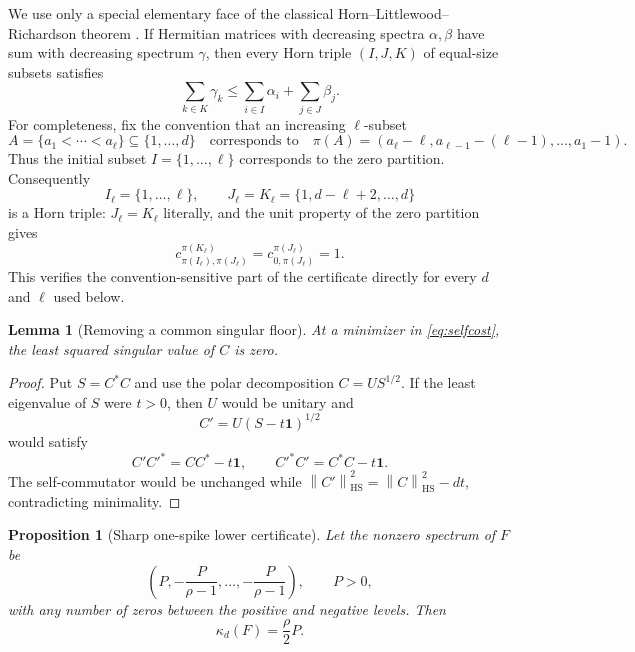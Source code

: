 \documentclass[11pt]{article}
\newtheorem{proposition}[theorem]{Proposition}
\newtheorem{lemma}[theorem]{Lemma}
\theoremstyle{definition}
\theoremstyle{remark}
\newcommand{\1}{\mathbf 1}
\newcommand{\norm}[1]{\left\lVert #1\right\rVert}
\newcommand{\HS}{\mathrm{HS}}
\begin{document}
We use only a special elementary face of the classical Horn--Littlewood--Richardson theorem \cite{horn1962,klyachko1998,knutson1999,fulton2000}.  If Hermitian matrices with decreasing spectra $\alpha,\beta$ have sum with decreasing spectrum $\gamma$, then every Horn triple $(I,J,K)$ of equal-size subsets satisfies
\begin{equation}
 \sum_{k\in K}\gamma_k\le
 \sum_{i\in I}\alpha_i+\sum_{j\in J}\beta_j.
 \label{eq:Horn}
\end{equation}
For completeness, fix the convention that an increasing $\ell$-subset
\[
 A=\{a_1<\cdots<a_\ell\}\subseteq\{1,\ldots,d\}
 \quad\text{corresponds to}\quad
 \pi(A)=(a_\ell-\ell,a_{\ell-1}-(\ell-1),\ldots,a_1-1).
\]
Thus the initial subset $I=\{1,\ldots,\ell\}$ corresponds to the zero partition.  Consequently
\begin{equation}
 I_\ell=\{1,\ldots,\ell\},\qquad
 J_\ell=K_\ell=\{1,d-\ell+2,\ldots,d\}
 \label{eq:triples}
\end{equation}
is a Horn triple: $J_\ell=K_\ell$ literally, and the unit property of the zero partition gives
\[
 c^{\pi(K_\ell)}_{\pi(I_\ell),\pi(J_\ell)}
 =c^{\pi(J_\ell)}_{0,\pi(J_\ell)}=1.
\]
This verifies the convention-sensitive part of the certificate directly for every $d$ and $\ell$ used below.

\begin{lemma}[Removing a common singular floor]
\label{lem:floor}
At a minimizer in \eqref{eq:selfcost}, the least squared singular value of $C$ is zero.
\end{lemma}

\begin{proof}
Put $S=C^*C$ and use the polar decomposition $C=U S^{1/2}$.  If the least eigenvalue of $S$ were $t>0$, then $U$ would be unitary and
\[
 C'=U(S-t\1)^{1/2}
\]
would satisfy
\[
 C'C'^*=CC^*-t\1,\qquad C'^*C'=C^*C-t\1.
\]
The self-commutator would be unchanged while $\norm{C'}_{\HS}^2=\norm C_{\HS}^2-dt$, contradicting minimality.
\end{proof}

\begin{proposition}[Sharp one-spike lower certificate]
\label{prop:spike}
Let the nonzero spectrum of $F$ be
\[
 \left(P,-\frac{P}{\rho-1},\ldots,-\frac{P}{\rho-1}\right),
 \qquad P>0,
\]
with any number of zeros between the positive and negative levels.  Then
\[
 \kappa_d(F)=\frac\rho2P.
\]
\end{proposition}
\end{document}
